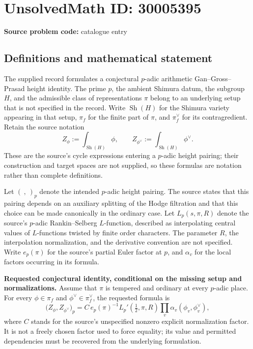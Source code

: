 \documentclass[11pt]{article}
\begin{document}
\section*{UnsolvedMath ID: 30005395}
\textbf{Source problem code:} catalogue entry
\subsection{Definitions and mathematical statement}
The supplied record formulates a conjectural \(p\)-adic arithmetic Gan--Gross--Prasad height identity. The prime \(p\), the ambient Shimura datum, the subgroup \(H\), and the admissible class of representations \(\pi\) belong to an underlying setup that is not specified in the record. Write \(\operatorname{Sh}(H)\) for the Shimura variety appearing in that setup, \(\pi_f\) for the finite part of \(\pi\), and \(\pi_f^\vee\) for its contragredient. Retain the source notation
\[
Z_\phi:=\int_{\operatorname{Sh}(H)}\phi,
\qquad
Z_{\phi^\vee}:=\int_{\operatorname{Sh}(H)}\phi^\vee.
\]
These are the source's cycle expressions entering a \(p\)-adic height pairing; their construction and target spaces are not supplied, so these formulas are notation rather than complete definitions.

Let \((\ ,\ )_p\) denote the intended \(p\)-adic height pairing. The source states that this pairing depends on an auxiliary splitting of the Hodge filtration and that this choice can be made canonically in the ordinary case. Let \(L_p(s,\pi,R)\) denote the source's \(p\)-adic Rankin--Selberg \(L\)-function, described as interpolating central values of \(L\)-functions twisted by finite order characters. The parameter \(R\), the interpolation normalization, and the derivative convention are not specified. Write \(e_p(\pi)\) for the source's partial Euler factor at \(p\), and \(\alpha_v\) for the local factors occurring in its formula.

\textbf{Requested conjectural identity, conditional on the missing setup and normalizations.} Assume that \(\pi\) is tempered and ordinary at every \(p\)-adic place. For every \(\phi\in\pi_f\) and \(\phi^\vee\in\pi_f^\vee\), the requested formula is
\[
\bigl(Z_\phi,Z_{\phi^\vee}\bigr)_p
=
C\,e_p(\pi)^{-1}
L_p'\!\left(\tfrac12,\pi,R\right)
\prod_v\alpha_v(\phi_v,\phi_v^\vee),
\]
where \(C\) stands for the source's unspecified nonzero explicit normalization factor. It is not a freely chosen factor used to force equality; its value and permitted dependencies must be recovered from the underlying formulation.
\end{document}
